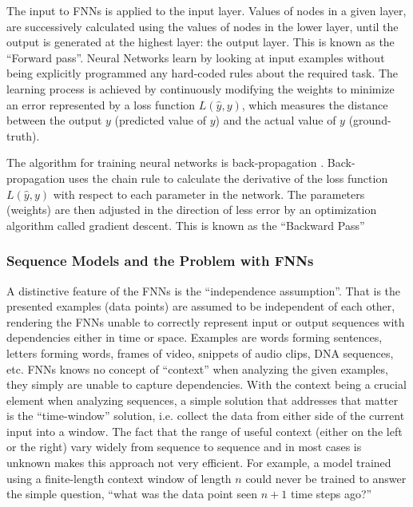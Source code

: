 The input to \ac{FNN}s is applied to the input layer. Values of nodes in a given layer, are successively calculated using the values of nodes in the lower layer, until the output is generated at the highest layer: the output layer. This is known as the \enquote{Forward pass}.
Neural Networks learn by looking at input examples without being explicitly programmed any hard-coded rules about the required task. The learning process is achieved by continuously modifying the weights to minimize an error represented by a loss function $ L(\widehat{y}, y) $, which measures the distance between the output $y$ (predicted value of $y$) and the actual value of $y$ (ground-truth).

The algorithm for training neural networks is back-propagation \cite{rumelhart1985learning}. Back-propagation uses the chain rule to calculate the derivative of the loss function $L(\widehat{y}, y)$ with respect to each parameter in the network. The parameters (weights) are then adjusted in the direction of less error by an optimization algorithm called gradient descent. This is known as the \enquote{Backward Pass}

\subsubsection{Sequence Models and the Problem with \ac{FNN}s}
\label{bg:s2_sub1_subsub1}

A distinctive feature of the \ac{FNN}s is the \enquote{independence assumption}. That is the presented examples (data points) are assumed to be independent of each other, rendering the \ac{FNN}s unable to correctly represent input or output sequences with dependencies either in time or space. Examples are words forming sentences, letters forming words, frames of video, snippets of audio clips, DNA sequences, etc. \ac{FNN}s knows no concept of “context” when analyzing the given examples, they simply are unable to capture dependencies. With the context being a crucial element when analyzing sequences, a simple solution that addresses that matter is the \enquote{time-window} solution, i.e. collect the data from either side of the current input into a window. The fact that the range of useful context (either on the left or the right) vary widely from sequence to sequence and in most cases is unknown makes this approach not very efficient.
For example, a model trained using a finite-length context window of length $n$ could never be trained to answer the simple question, \enquote{what was the data point seen $n+\mathrm{1}$ time steps ago?}


